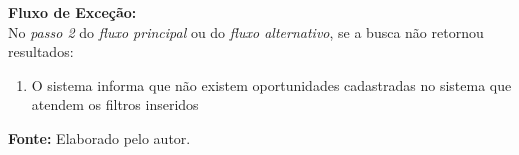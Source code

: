 \begin{quadro}[t]
{\begin{minipage}{0.9\textwidth}
\begin{enumerate}[topsep=0pt]
            \end{enumerate}
            \textbf{Fluxo de Exceção:}\\
            No \textit{passo 2} do \textit{fluxo principal} ou do \textit{fluxo alternativo}, se a busca não retornou resultados:
            \begin{enumerate}[topsep=0pt]
                \item O sistema informa que não existem oportunidades cadastradas no sistema que atendem os filtros inseridos 
            \end{enumerate}%
            \vspace{5pt}%
        \end{minipage}
    }

    \vspace{5pt}
    \hspace*{0.75cm}\raggedright{\small \textbf{Fonte:} Elaborado pelo autor.}
\end{quadro}